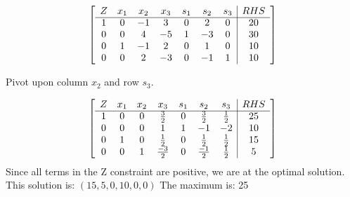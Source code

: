 \documentclass[10pt, letterpaper]{paper}
\begin{document}
\[
	\left[ {\begin{array}{ccccccc|c}
	Z & x_1 & x_2 & x_3 & s_1 & s_2 & s_3 & RHS\\ \cline{1-8}
	1 & 0 & -1 & 3 & 0 & 2 & 0 & 20\\
	0 & 0 & 4 & -5 & 1 & -3 & 0 & 30\\
	0 & 1 & -1 & 2 & 0 & 1 & 0 & 10\\
	0 & 0 & 2 & -3 & 0 & -1 & 1 & 10\\
	\end{array} } \right]
\]

Pivot upon column $x_2$ and row $s_3$.

\[
	\left[ {\begin{array}{ccccccc|c}
	Z & x_1 & x_2 & x_3 & s_1 & s_2 & s_3 & RHS\\ \cline{1-8}
	1 & 0 & 0 & \frac{3}{2} & 0 & \frac{3}{2} & \frac{1}{2} & 25\\
	0 & 0 & 0 & 1 & 1 & -1 & -2 & 10\\
	0 & 1 & 0 & \frac{1}{2} & 0 & \frac{1}{2} & \frac{1}{2} & 15\\
	0 & 0 & 1 & \frac{-3}{2} & 0 & \frac{-1}{2} & \frac{1}{2} & 5\\
	\end{array} } \right]
\]
Since all terms in the Z constraint are positive, we are at the optimal solution. This solution is: $(15, 5, 0, 10, 0, 0)$ The maximum is: 25
\end{document}
